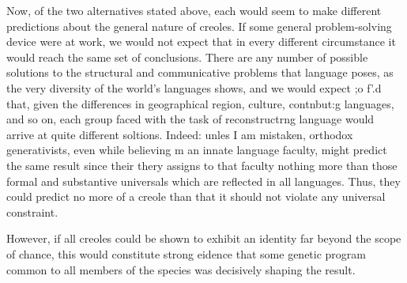 Now, of the two alternatives stated above, each would seem to make different predictions about the general nature of creoles. If some general problem-solving device were at work, we would not expect that in every different circumstance it would reach the same set of conclusions. There are any number of possible solutions to the struc\-tural and communicative problems that language poses, as the very diversity of the world's languages shows, and we would expect ;o f'.{\textquotedbl}d that, given the differences in geographical region, culture, contnbut:{\textquotedbl}g languages, and so on, each group faced with the task of reconstructrng language would arrive at quite different soltions. Indeed: unles I am mistaken, orthodox generativists, even while believing m an innate language faculty, might predict the same result since their thery assigns to that faculty nothing more than those formal and substantive universals which are reflected in all languages. Thus, they could pre\-dict no more of a creole than that it should not violate any universal constraint.

However, if all creoles could be shown to exhibit an identity far beyond the scope of chance, this would constitute strong eidence that some genetic program common to all members of the species was decisively shaping the result.